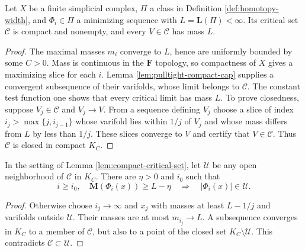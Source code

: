 \begin{lemma}\label{lem:compact-critical-set}
Let $X$ be a finite simplicial complex, $\Pi$ a class in Definition \ref{def:homotopy-width}, and $\Phi_i\in\Pi$ a minimizing sequence with $L=\mathbf L(\Pi)<\infty$. Its critical set $\mathcal C$ is compact and nonempty, and every $V\in\mathcal C$ has mass $L$.
\end{lemma}
\begin{proof}
The maximal masses $m_i$ converge to $L$, hence are uniformly bounded by some $C>0$. Mass is continuous in the $\mathbf F$ topology, so compactness of $X$ gives a maximizing slice for each $i$. Lemma \ref{lem:pulltight-compact-cap} supplies a convergent subsequence of their varifolds, whose limit belongs to $\mathcal C$. The constant test function one shows that every critical limit has mass $L$.
To prove closedness, suppose $V_j\in\mathcal C$ and $V_j\to V$. From a sequence defining $V_j$ choose a slice of index $i_j>\max\{j,i_{j-1}\}$ whose varifold lies within $1/j$ of $V_j$ and whose mass differs from $L$ by less than $1/j$. These slices converge to $V$ and certify that $V\in\mathcal C$. Thus $\mathcal C$ is closed in compact $K_C$.
\end{proof}

\begin{lemma}\label{lem:near-critical-slices}
In the setting of Lemma \ref{lem:compact-critical-set}, let $\mathcal U$ be any open neighborhood of $\mathcal C$ in $K_C$. There are $\eta>0$ and $i_0$ such that
\[
 i\geq i_0,\quad \mathbf M(\Phi_i(x))\geq L-\eta
 \quad\Longrightarrow\quad |\Phi_i(x)|\in\mathcal U.
\]
\end{lemma}
\begin{proof}
Otherwise choose $i_j\to\infty$ and $x_j$ with masses at least $L-1/j$ and varifolds outside $\mathcal U$. Their masses are at most $m_{i_j}\to L$. A subsequence converges in $K_C$ to a member of $\mathcal C$, but also to a point of the closed set $K_C\setminus\mathcal U$. This contradicts $\mathcal C\subset\mathcal U$.
\end{proof}

